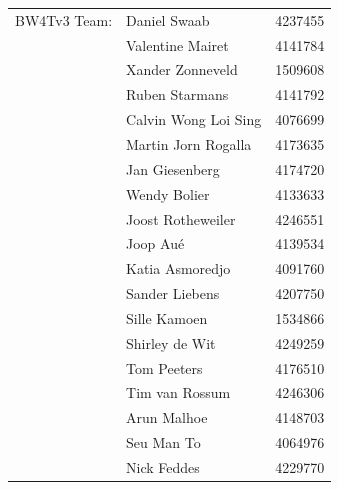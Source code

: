 \begin{titlepage}
\begin{center}
\begin{tabular}{lll}
    BW4Tv3 Team: & Daniel Swaab & 4237455\\
        & Valentine Mairet     & 4141784\\
        & Xander Zonneveld     & 1509608\\
        & Ruben Starmans       & 4141792\\
        & Calvin Wong Loi Sing & 4076699\\
        & Martin Jorn Rogalla  & 4173635\\
        & Jan Giesenberg       & 4174720\\
        & Wendy Bolier         & 4133633\\
        & Joost Rotheweiler    & 4246551\\
        & Joop Aué             & 4139534\\
        & Katia Asmoredjo      & 4091760\\
        & Sander Liebens       & 4207750\\
        & Sille Kamoen         & 1534866\\
        & Shirley de Wit       & 4249259\\
        & Tom Peeters          & 4176510\\
        & Tim van Rossum       & 4246306\\
        & Arun Malhoe          & 4148703\\
        & Seu Man To           & 4064976\\
        & Nick Feddes          & 4229770
\end{tabular}

\bigskip
\bigskip

\bigskip
\bigskip

\end{center}

\end{titlepage}
